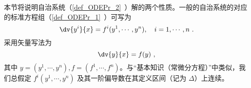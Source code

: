 
本节将说明自治系统（\autoref{def_ODEPr_2}~）解的两个性质。一般的自治系统的对应的标准方程组（\autoref{def_ODEPr_1}~）可写为
\begin{equation}
\dv{y^i}{x}=f^i(y^1,\cdots,y^n),\quad i=1,\cdots,n~.
\end{equation}
采用矢量写法为
\begin{equation}
\dv{y}{x}=f(y)~,
\end{equation}
其中 $y=(y^1,\cdots,y^n),f=(f^1,\cdots,f^n)$。与“基本知识（常微分方程）”中类似，我们总假定 $f^i(y^1,\cdots,y^n)$ 及其一阶偏导数在其定义区间（记为 $\Delta$）上连续。


